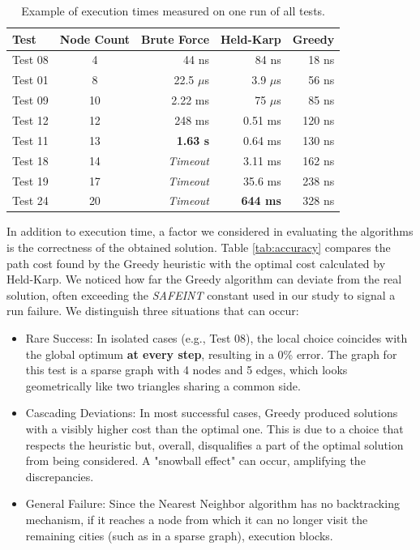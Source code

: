 \begin{table}[H]
    \centering
    \caption{Example of execution times measured on one run of all tests.}
    \label{tab:benchmark_summary}
    \begin{tabular}{|l|c|r|r|r|}
        \hline
        \textbf{Test} & \textbf{Node Count} & \textbf{Brute Force} & \textbf{Held-Karp} & \textbf{Greedy} \\
        \hline
        Test 08 & 4  & 44 ns            & 84 ns             & 18 ns \\
        Test 01 & 8  & 22.5 $\mu$s      & 3.9 $\mu$s        & 56 ns \\
        Test 09 & 10 & 2.22 ms          & 75 $\mu$s         & 85 ns \\
        Test 12 & 12 & 248 ms           & 0.51 ms           & 120 ns \\
        Test 11 & 13 & \textbf{1.63 s}  & 0.64 ms           & 130 ns \\
        Test 18 & 14 & \textit{Timeout} & 3.11 ms           & 162 ns \\
        Test 19 & 17 & \textit{Timeout} & 35.6 ms           & 238 ns \\
        Test 24 & 20 & \textit{Timeout} & \textbf{644 ms}   & 328 ns \\
        \hline
    \end{tabular}
\end{table}

In addition to execution time, a factor we considered in evaluating the algorithms is the correctness of the obtained solution. Table 
\ref{tab:accuracy} compares the path cost found by the Greedy heuristic with the optimal cost calculated by Held-Karp. We noticed how far 
the Greedy algorithm can deviate from the real solution, often exceeding the \textit{SAFEINT} constant used in our study to signal a run failure. 
We distinguish three situations that can occur:

\begin{itemize}
    \item Rare Success: In isolated cases (e.g., Test 08), the local choice coincides with the global optimum \textbf{at every step}, resulting in a 0\% error.
    The graph for this test is a sparse graph with 4 nodes and 5 edges, which looks geometrically like two triangles sharing a common side.
    \item Cascading Deviations: In most successful cases, Greedy produced solutions with a visibly higher cost than the optimal one. 
    This is due to a choice that respects the heuristic but, overall, disqualifies a part of the optimal solution from being considered. 
    A "snowball effect" can occur, amplifying the discrepancies.
    \item General Failure: Since the Nearest Neighbor algorithm has no backtracking mechanism, if it reaches a node from which it can no 
    longer visit the remaining cities (such as in a sparse graph), execution blocks.
\end{itemize}

